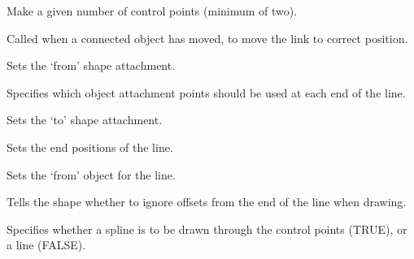 \label{wxlineshapemakelinecontrolpoints}


Make a given number of control points (minimum of two).



Called when a connected object has moved, to move the link to
correct position.



Sets the `from' shape attachment.



Specifies which object attachment points should be used at each end of the line.



Sets the `to' shape attachment.



Sets the end positions of the line.



Sets the `from' object for the line.



Tells the shape whether to ignore offsets from the end of the line when drawing.



Specifies whether a spline is to be drawn through the control points (TRUE), or a line (FALSE).

